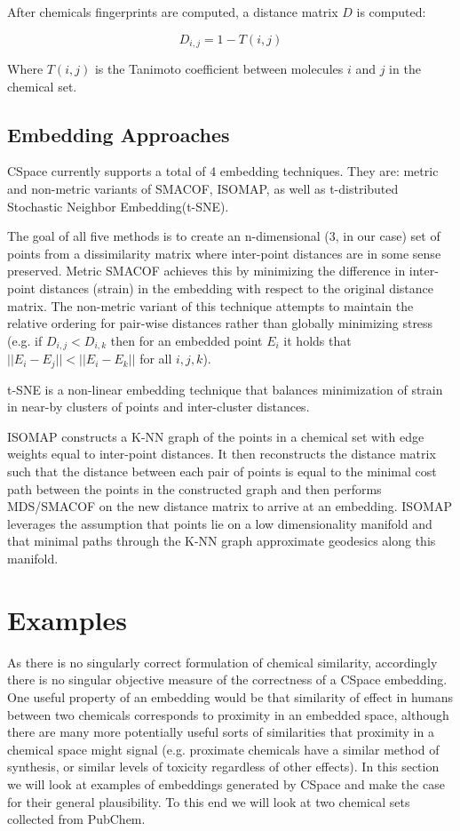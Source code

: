 \documentclass[12pt]{article}
\begin{document}
After chemicals fingerprints are computed, a distance matrix $D$ is computed:

\begin{equation}
  D_{i,j} = 1 - T(i,j)
\end{equation}

Where $T(i,j)$ is the Tanimoto coefficient between molecules $i$ and $j$ in the chemical set.

\subsection{Embedding Approaches}
CSpace currently supports a total of 4 embedding techniques. They are: metric and non-metric variants of SMACOF, ISOMAP, as well as t-distributed Stochastic Neighbor Embedding(t-SNE).

The goal of all five methods is to create an n-dimensional (3, in our case) set of points from a dissimilarity matrix where inter-point distances are in some sense preserved. Metric SMACOF achieves this by minimizing the difference in inter-point distances (strain) in the embedding with respect to the original distance matrix. The non-metric variant of this technique attempts to maintain the relative ordering for pair-wise distances rather than globally minimizing stress (e.g. if $D_{i,j} < D_{i,k}$ then for an embedded point $E_i$ it holds that $||E_i - E_j|| < ||E_i - E_k||$ for all $i, j, k$).

t-SNE is a non-linear embedding technique that balances minimization of strain in near-by clusters of points and inter-cluster distances\cite{maaten2008visualizing}.

ISOMAP constructs a K-NN graph of the points in a chemical set with edge weights equal to inter-point distances. It then reconstructs the distance matrix such that the distance between each pair of points is equal to the minimal cost path between the points in the constructed graph and then performs MDS/SMACOF on the new distance matrix to arrive at an embedding\cite{tenenbaum2000global}. ISOMAP leverages the assumption that points lie on a low dimensionality manifold and that minimal paths through the K-NN graph approximate geodesics along this manifold.

\section{Examples}
As there is no singularly correct formulation of chemical similarity, accordingly there is no singular objective measure of the correctness of a CSpace embedding. One useful property of an embedding would be that similarity of effect in humans between two chemicals corresponds to proximity in an embedded space, although there are many more potentially useful sorts of similarities that proximity in a chemical space might signal (e.g. proximate chemicals have a similar method of synthesis, or similar levels of toxicity regardless of other effects). In this section we will look at examples of embeddings generated by CSpace and make the case for their general plausibility. To this end we will look at two chemical sets collected from PubChem.
\end{document}
